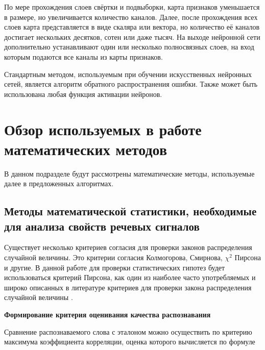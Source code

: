 По мере прохождения слоев свёртки и подвыборки, карта признаков уменьшается в размере, но увеличивается количество каналов.
Далее, после прохождения всех слоев карта представляется в виде скаляра или вектора, но количество её каналов достигает нескольких десятков, сотен или даже тысяч.
На выходе нейронной сети дополнительно устанавливают один или несколько полносвязных слоев, на вход которым подаются все каналы из карты признаков.

Стандартным методом, используемым при обучении искусственных нейронных сетей, является алгоритм обратного распространения ошибки.
Также может быть использована любая функция активации нейронов.


\section{Обзор используемых в работе математических методов} \label{sect1_4}

В данном подразделе будут рассмотрены математические методы, используемые далее в предложенных алгоритмах.


\subsection{Методы математической статистики, необходимые для анализа свойств речевых сигналов} \label{sect1_4_1}

Существует несколько критериев согласия для проверки законов распределения случайной величины.
Это критерии согласия Колмогорова, Смирнова, $\chi^2$ Пирсона и другие.
В данной работе для проверки статистических гипотез будет использоваться критерий Пирсона, как один из наиболее часто употребляемых и широко описанных в литературе критериев для проверки закона распределения случайной величины \cite{panteleev2001}.

\textbf{Формирование критерия оценивания качества распознавания}

Сравнение распознаваемого слова с эталоном можно осуществить по критерию максимума коэффициента корреляции, оценка которого вычисляется по формуле 

